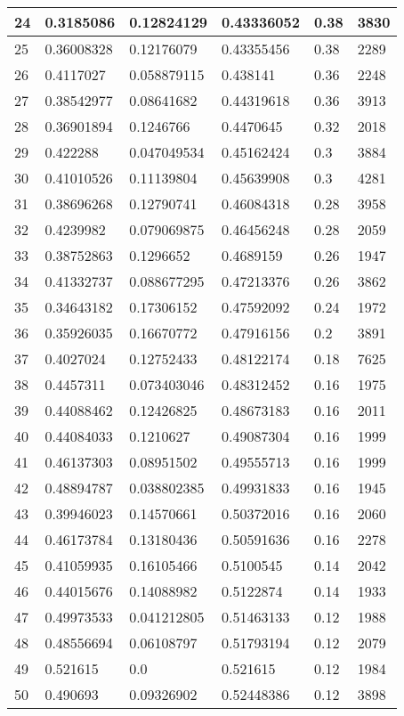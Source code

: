 \begin{longtable}{|l|l|l|l|l|l|}
24 & 0.3185086 & 0.12824129 & 0.43336052 & 0.38 & 3830 \\ \hline 
25 & 0.36008328 & 0.12176079 & 0.43355456 & 0.38 & 2289 \\ \hline 
26 & 0.4117027 & 0.058879115 & 0.438141 & 0.36 & 2248 \\ \hline 
27 & 0.38542977 & 0.08641682 & 0.44319618 & 0.36 & 3913 \\ \hline 
28 & 0.36901894 & 0.1246766 & 0.4470645 & 0.32 & 2018 \\ \hline 
29 & 0.422288 & 0.047049534 & 0.45162424 & 0.3 & 3884 \\ \hline 
30 & 0.41010526 & 0.11139804 & 0.45639908 & 0.3 & 4281 \\ \hline 
31 & 0.38696268 & 0.12790741 & 0.46084318 & 0.28 & 3958 \\ \hline 
32 & 0.4239982 & 0.079069875 & 0.46456248 & 0.28 & 2059 \\ \hline 
33 & 0.38752863 & 0.1296652 & 0.4689159 & 0.26 & 1947 \\ \hline 
34 & 0.41332737 & 0.088677295 & 0.47213376 & 0.26 & 3862 \\ \hline 
35 & 0.34643182 & 0.17306152 & 0.47592092 & 0.24 & 1972 \\ \hline 
36 & 0.35926035 & 0.16670772 & 0.47916156 & 0.2 & 3891 \\ \hline 
37 & 0.4027024 & 0.12752433 & 0.48122174 & 0.18 & 7625 \\ \hline 
38 & 0.4457311 & 0.073403046 & 0.48312452 & 0.16 & 1975 \\ \hline 
39 & 0.44088462 & 0.12426825 & 0.48673183 & 0.16 & 2011 \\ \hline 
40 & 0.44084033 & 0.1210627 & 0.49087304 & 0.16 & 1999 \\ \hline 
41 & 0.46137303 & 0.08951502 & 0.49555713 & 0.16 & 1999 \\ \hline 
42 & 0.48894787 & 0.038802385 & 0.49931833 & 0.16 & 1945 \\ \hline 
43 & 0.39946023 & 0.14570661 & 0.50372016 & 0.16 & 2060 \\ \hline 
44 & 0.46173784 & 0.13180436 & 0.50591636 & 0.16 & 2278 \\ \hline 
45 & 0.41059935 & 0.16105466 & 0.5100545 & 0.14 & 2042 \\ \hline 
46 & 0.44015676 & 0.14088982 & 0.5122874 & 0.14 & 1933 \\ \hline 
47 & 0.49973533 & 0.041212805 & 0.51463133 & 0.12 & 1988 \\ \hline 
48 & 0.48556694 & 0.06108797 & 0.51793194 & 0.12 & 2079 \\ \hline 
49 & 0.521615 & 0.0 & 0.521615 & 0.12 & 1984 \\ \hline 
50 & 0.490693 & 0.09326902 & 0.52448386 & 0.12 & 3898 \\ \hline 
\end{longtable}